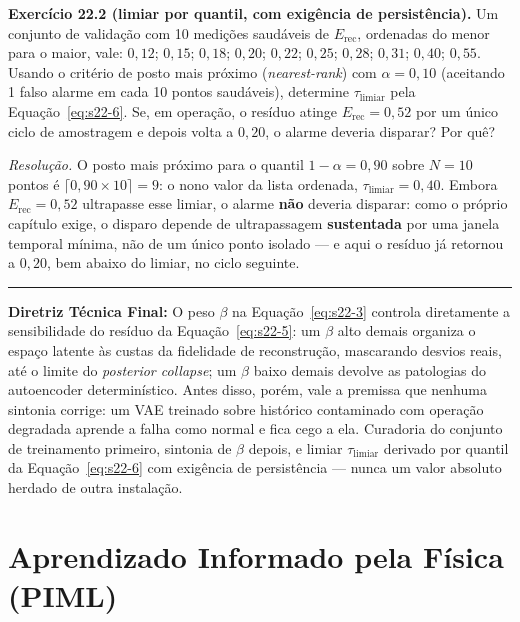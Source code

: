 \documentclass[12pt,a4paper]{article}
\numberwithin{equation}{section}
\numberwithin{table}{section}
\numberwithin{figure}{section}
\begin{document}
	\textbf{Exercício 22.2 (limiar por quantil, com exigência de
	persistência).} Um conjunto de validação com 10 medições saudáveis de
	$E_{\text{rec}}$, ordenadas do menor para o maior, vale: $0{,}12$;
	$0{,}15$; $0{,}18$; $0{,}20$; $0{,}22$; $0{,}25$; $0{,}28$; $0{,}31$;
	$0{,}40$; $0{,}55$. Usando o critério de posto mais próximo
	(\textit{nearest-rank}) com $\alpha=0{,}10$ (aceitando 1 falso alarme
	em cada 10 pontos saudáveis), determine $\tau_{\text{limiar}}$ pela
	Equação~\eqref{eq:s22-6}. Se, em operação, o resíduo atinge
	$E_{\text{rec}}=0{,}52$ por um único ciclo de amostragem e depois
	volta a $0{,}20$, o alarme deveria disparar? Por quê?

	\emph{Resolução.} O posto mais próximo para o quantil $1-\alpha=0{,}90$
	sobre $N=10$ pontos é $\lceil 0{,}90 \times 10 \rceil = 9$: o nono
	valor da lista ordenada, $\tau_{\text{limiar}} = 0{,}40$. Embora
	$E_{\text{rec}}=0{,}52$ ultrapasse esse limiar, o alarme \textbf{não}
	deveria disparar: como o próprio capítulo exige, o disparo depende de
	ultrapassagem \textbf{sustentada} por uma janela temporal mínima, não
	de um único ponto isolado --- e aqui o resíduo já retornou a
	$0{,}20$, bem abaixo do limiar, no ciclo seguinte.

	\vspace{1em}
	\hrule
	\vspace{1em}

	\textbf{Diretriz Técnica Final:} O peso $\beta$ na Equação~\eqref{eq:s22-3} controla diretamente a sensibilidade do resíduo da Equação~\eqref{eq:s22-5}: um $\beta$ alto demais organiza o espaço latente às custas da fidelidade de reconstrução, mascarando desvios reais, até o limite do \textit{posterior collapse}; um $\beta$ baixo demais devolve as patologias do autoencoder determinístico. Antes disso, porém, vale a premissa que nenhuma sintonia corrige: um VAE treinado sobre histórico contaminado com operação degradada aprende a falha como normal e fica cego a ela. Curadoria do conjunto de treinamento primeiro, sintonia de $\beta$ depois, e limiar $\tau_{\text{limiar}}$ derivado por quantil da Equação~\eqref{eq:s22-6} com exigência de persistência — nunca um valor absoluto herdado de outra instalação.

	\clearpage
	\section{Aprendizado Informado pela Física (PIML)}

\end{document}
